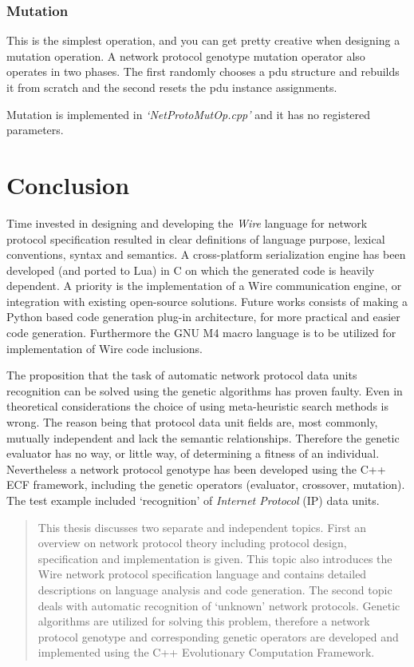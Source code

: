 \documentclass[times, utf8, diplomski]{fer}
\begin{document}
\subsection{Mutation}
This is the simplest operation, and you can get pretty creative when designing 
a mutation operation. A network protocol genotype mutation operator also operates 
in two phases. The first randomly chooses a pdu structure and rebuilds it from 
scratch and the second resets the pdu instance assignments.

Mutation is implemented in \emph{`NetProtoMutOp.cpp'} and it has no registered
parameters.

\chapter{Conclusion}
Time invested in designing and developing the \emph{Wire} language for network
protocol specification resulted in clear definitions of language purpose, lexical
conventions, syntax and semantics. A cross-platform serialization engine has been
developed (and ported to Lua) in C on which the generated code is heavily dependent. A priority is the 
implementation of a Wire communication engine, or integration with existing open-source 
solutions. Future works consists of making a Python based code generation plug-in 
architecture, for more practical and easier code generation. Furthermore the 
GNU M4 macro language is to be utilized for implementation of Wire code inclusions.

The proposition that the task of automatic network protocol data units recognition
can be solved using the genetic algorithms has proven faulty. Even in theoretical
considerations the choice of using meta-heuristic search methods is wrong. The reason 
being that protocol data unit fields are, most commonly, mutually independent and lack the semantic
relationships. Therefore the genetic evaluator has no way, or little way, of determining
a fitness of an individual. Nevertheless a network protocol genotype has been developed
using the C++ ECF framework, including the genetic operators (evaluator, crossover, mutation).
The test example included `recognition' of \emph{Internet Protocol} (IP) data units. 




\begin{abstract}
This thesis discusses two separate and independent topics. First an overview on 
network protocol theory including protocol design, specification and implementation 
is given. This topic also introduces the Wire network protocol specification language 
and contains detailed descriptions on language analysis and code generation. 
The second topic deals with automatic recognition of `unknown' network protocols. 
Genetic algorithms are utilized for solving this problem, therefore a network 
protocol genotype and corresponding genetic operators are developed and implemented 
using the C++ Evolutionary Computation Framework.

\end{abstract}
\end{document}
